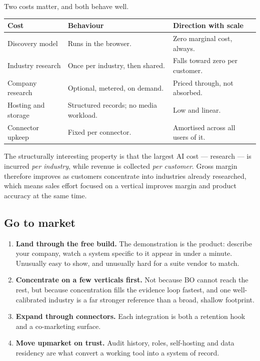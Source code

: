 \documentclass[11pt,a4paper]{article}
\begin{document}
Two costs matter, and both behave well.

\begin{center}
\begin{tabular}{@{}l l l@{}}
\toprule
\textbf{Cost} & \textbf{Behaviour} & \textbf{Direction with scale} \\
\midrule
Discovery model     & Runs in the browser.                    & Zero marginal cost, always. \\
Industry research   & Once per industry, then shared.         & Falls toward zero per customer. \\
Company research    & Optional, metered, on demand.           & Priced through, not absorbed. \\
Hosting and storage & Structured records; no media workload.  & Low and linear. \\
Connector upkeep    & Fixed per connector.                    & Amortised across all users of it. \\
\bottomrule
\end{tabular}
\end{center}

The structurally interesting property is that the largest AI cost --- research --- is incurred
\emph{per industry}, while revenue is collected \emph{per customer}. Gross margin therefore improves
as customers concentrate into industries already researched, which means sales effort focused on a
vertical improves margin and product accuracy at the same time.

\subsection{Go to market}

\begin{enumerate}[leftmargin=1.6em,itemsep=3pt]
  \item \textbf{Land through the free build.} The demonstration is the product: describe your
        company, watch a system specific to it appear in under a minute. Unusually easy to show, and
        unusually hard for a suite vendor to match.
  \item \textbf{Concentrate on a few verticals first.} Not because BO cannot reach the rest, but
        because concentration fills the evidence loop fastest, and one well-calibrated industry is a
        far stronger reference than a broad, shallow footprint.
  \item \textbf{Expand through connectors.} Each integration is both a retention hook and a
        co-marketing surface.
  \item \textbf{Move upmarket on trust.} Audit history, roles, self-hosting and data residency are
        what convert a working tool into a system of record.
\end{enumerate}
\end{document}

